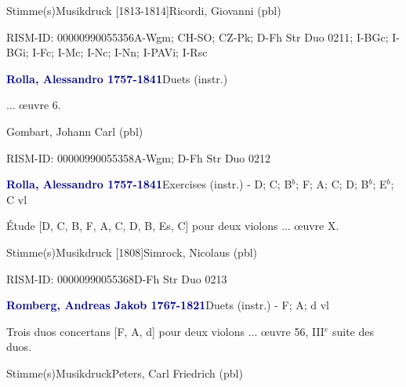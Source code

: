 \documentclass[twocolumn, 12pt]{book}
\begin{document}
\par \textcolor{darkblue}{}  Stimme(s)\newline Musikdruck  [1813-1814]\newline Ricordi, Giovanni  (pbl)
\par RISM-ID: 00000990055356\newline A-Wgm; CH-SO; CZ-Pk; D-Fh  Str Duo 0211; I-BGc; I-BGi; I-Fc; I-Mc; I-Nc; I-Nn; I-PAVi; I-Rsc
\par \vspace{16pt} \textcolor{darkblue}{\textbf{Rolla, Alessandro  1757-1841}}\hfillplus{\textbf{[321]}}\newline Duets (instr.)
\par \begin{itshape}... œuvre 6.\end{itshape} \newline Gombart, Johann Carl  (pbl)
\par RISM-ID: 00000990055358\newline A-Wgm; D-Fh  Str Duo 0212
\par \vspace{16pt} \textcolor{darkblue}{\textbf{Rolla, Alessandro  1757-1841}}\hfillplus{\textbf{[322]}}\newline Exercises (instr.) - D; C; B$^b$; F; A; C; D; B$^b$; E$^b$; C vl
\par \begin{itshape}Étude [D, C, B, F, A, C, D, B, Es, C] pour deux violons ... œuvre X.\end{itshape} 
\par \textcolor{darkblue}{}  Stimme(s)\newline Musikdruck  [1808]\newline Simrock, Nicolaus  (pbl)
\par RISM-ID: 00000990055368\newline D-Fh  Str Duo 0213
\par \vspace{16pt} \textcolor{darkblue}{\textbf{Romberg, Andreas Jakob  1767-1821}}\hfillplus{\textbf{[323]}}\newline Duets (instr.) - F; A; d vl
\par \begin{itshape}Trois duos concertans [F, A, d] pour deux violons ... œuvre 56, III$^e$ suite des duos.\end{itshape} 
\par \textcolor{darkblue}{}  Stimme(s)\newline Musikdruck\newline Peters, Carl Friedrich  (pbl)
\end{document}
